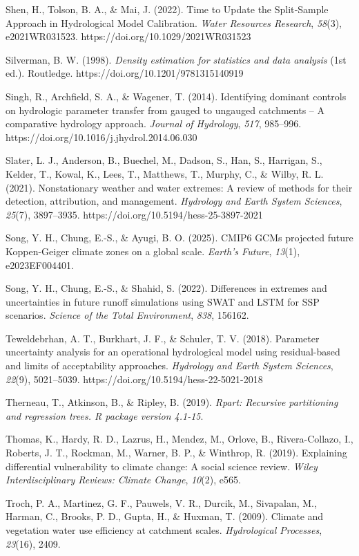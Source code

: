 \documentclass[
]{article}
\begin{document}
Shen, H., Tolson, B. A., \& Mai, J. (2022). Time to Update the
Split‐Sample Approach in Hydrological Model Calibration. \emph{Water
Resources Research}, \emph{58}(3), e2021WR031523.
https://doi.org/10.1029/2021WR031523

Silverman, B. W. (1998). \emph{Density estimation for statistics and
data analysis} (1st ed.). Routledge.
https://doi.org/10.1201/9781315140919

Singh, R., Archfield, S. A., \& Wagener, T. (2014). Identifying dominant
controls on hydrologic parameter transfer from gauged to ungauged
catchments -- A comparative hydrology approach. \emph{Journal of
Hydrology}, \emph{517}, 985--996.
https://doi.org/10.1016/j.jhydrol.2014.06.030

Slater, L. J., Anderson, B., Buechel, M., Dadson, S., Han, S., Harrigan,
S., Kelder, T., Kowal, K., Lees, T., Matthews, T., Murphy, C., \& Wilby,
R. L. (2021). Nonstationary weather and water extremes: A review of
methods for their detection, attribution, and management.
\emph{Hydrology and Earth System Sciences}, \emph{25}(7), 3897--3935.
https://doi.org/10.5194/hess-25-3897-2021

Song, Y. H., Chung, E.-S., \& Ayugi, B. O. (2025). CMIP6 GCMs projected
future Koppen-Geiger climate zones on a global scale. \emph{Earth's
Future}, \emph{13}(1), e2023EF004401.

Song, Y. H., Chung, E.-S., \& Shahid, S. (2022). Differences in extremes
and uncertainties in future runoff simulations using SWAT and LSTM for
SSP scenarios. \emph{Science of the Total Environment}, \emph{838},
156162.

Teweldebrhan, A. T., Burkhart, J. F., \& Schuler, T. V. (2018).
Parameter uncertainty analysis for an operational hydrological model
using residual-based and limits of acceptability approaches.
\emph{Hydrology and Earth System Sciences}, \emph{22}(9), 5021--5039.
https://doi.org/10.5194/hess-22-5021-2018

Therneau, T., Atkinson, B., \& Ripley, B. (2019). \emph{Rpart: Recursive
partitioning and regression trees. R package version 4.1-15}.

Thomas, K., Hardy, R. D., Lazrus, H., Mendez, M., Orlove, B.,
Rivera-Collazo, I., Roberts, J. T., Rockman, M., Warner, B. P., \&
Winthrop, R. (2019). Explaining differential vulnerability to climate
change: A social science review. \emph{Wiley Interdisciplinary Reviews:
Climate Change}, \emph{10}(2), e565.

Troch, P. A., Martinez, G. F., Pauwels, V. R., Durcik, M., Sivapalan,
M., Harman, C., Brooks, P. D., Gupta, H., \& Huxman, T. (2009). Climate
and vegetation water use efficiency at catchment scales.
\emph{Hydrological Processes}, \emph{23}(16), 2409.
\end{document}
